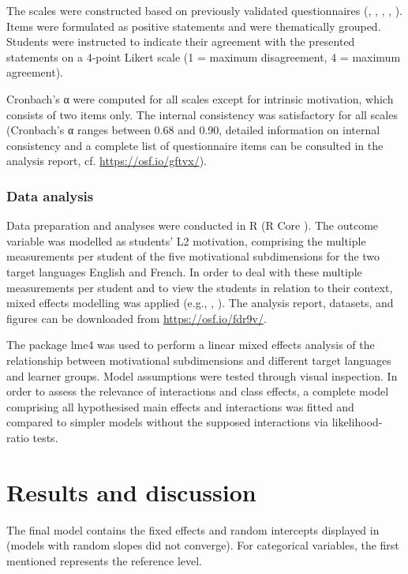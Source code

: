 \documentclass[output=paper]{langsci/langscibook}
\begin{document}
The scales were constructed based on previously validated questionnaires (\citealt{HorwitzEtAl1986}, \citealt{Stoeckli2004}, \citealt{Doernyei2010}, \citealt{Heinzmann2013}, \citealt{PeyerEtAl2016}). Items were formulated as positive statements and were thematically grouped. Students were instructed to indicate their agreement with the presented statements on a 4-point Likert scale (1 = maximum disagreement, 4 = maximum agreement). 

Cronbach’s α were computed for all scales except for intrinsic motivation, which consists of two items only. The internal consistency was satisfactory for all scales (Cronbach’s α ranges between 0.68 and 0.90, detailed information on internal consistency and a complete list of questionnaire items can be consulted in the analysis report, cf. \url{https://osf.io/gftvx/}).


\subsubsection{Data analysis}


Data preparation and analyses were conducted in R (R Core \citealt{Team2019}). The outcome variable was modelled as students’ L2 motivation, comprising the multiple measurements per student of the five motivational subdimensions for the two target languages English and French. In order to deal with these multiple measurements per student and to view the students in relation to their context, mixed effects modelling was applied (e.g., \citealt{BaayenEtAl2008}, \citealt{PfenningerSingleton2016}). The analysis report, datasets, and figures can be downloaded from \url{https://osf.io/fdr9v/}.

The package lme4 \citep{BatesEtAl2015} was used to perform a linear mixed effects analysis of the relationship between motivational subdimensions and different target languages and learner groups. Model assumptions were tested through visual inspection. In order to assess the relevance of interactions and class effects, a complete model comprising all hypothesised main effects and interactions was fitted and compared to simpler models without the supposed interactions via likelihood-ratio tests. 

\section{Results and discussion}

The final model contains the fixed effects and random intercepts displayed in  (models with random slopes did not converge). For categorical variables, the first mentioned represents the reference level.
\end{document}
